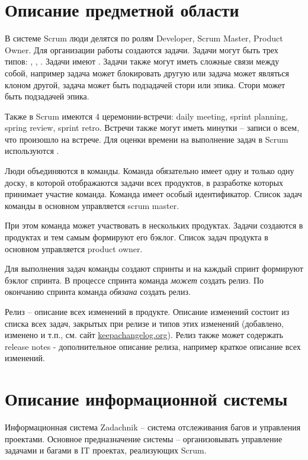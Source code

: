 \documentclass[14pt,a4paper]{extarticle}
\begin{document}

\tableofcontents

\section{Описание предметной области}
В системе Scrum люди делятся по ролям
Developer, Scrum Master, Product Owner.
Для организации работы создаются задачи.
Задачи могут быть трех типов: , ,
.
Задачи имеют .
Задачи также могут иметь сложные связи между собой, например
задача может блокировать другую или задача может являться клоном другой,
задача может быть подзадачей стори или эпика.
Стори может быть подзадачей эпика.

Также в Scrum имеются 4 церемонии-встречи: daily meeting, sprint
planning, spring review, sprint retro.
Встречи также могут иметь минутки -- записи о всем, что произошло на встрече.
Для оценки времени на выполнение задач в Scrum используются .

Люди объединяются в команды. Команда обязательно имеет одну и только одну доску,
в которой отображаются задачи всех продуктов, в разработке
которых принимает участие команда.
Команда имеет особый идентификатор.
Список задач команды в основном управляется scrum master.

При этом команда может участвовать в нескольких продуктах.
Задачи создаются в продуктах и тем самым формируют его бэклог.
Список задач продукта в основном управляется product owner.

Для выполнения задач команды создают спринты и на каждый
спринт формируют бэклог спринта.
В процессе спринта команда \emph{может} создать релиз.
По окончанию спринта команда \emph{обязана} создать релиз.

Релиз -- описание всех изменений в продукте.
Описание изменений состоит из списка всех задач,
закрытых при релизе и типов этих изменений (добавлено, изменено и т.п., см. сайт \url{keepachangelog.org}).
Релиз также может содержать release notes - дополнительное описание релиза, например
краткое описание всех изменений.

\section{Описание информационной системы}
Информационная система Zadachnik -- система отслеживания багов и
управления проектами.
Основное предназначение системы -- организовывать управление задачами и багами
в IT проектах, реализующих Scrum.
\end{document}
